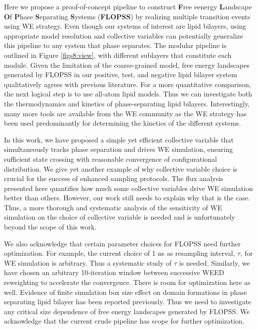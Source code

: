 \documentclass{biophys-new}
\begin{document}
Here we propose a proof-of-concept pipeline to construct \textbf{F}ree eenergy \textbf{L}andscape \textbf{O}f \textbf{P}hase \textbf{S}eparating \textbf{S}ystems (\textbf{FLOPSS}) by realizing multiple transition events using WE strategy.
Even though our systems of interest are lipid bilayers, using appropriate model resolution and collective variables can potentially generalize this pipeline to any system that phase separates.
The modular pipeline is outlined in Figure \ref{figs8:view}, with different sublayers that constitute each module.
Given the limitation of the coarse-grained model, free energy landscapes generated by FLOPSS in our positive, test, and negative lipid bilayer system qualitatively agrees with previous literature.
For a more quantitative comparison, the next logical step is to use all-atom lipid models.
Thus we can investigate both the thermodynamics and kinetics of phase-separating lipid bilayers.
Interestingly, many more tools are available from the WE community as the WE strategy has been used predominantly for determining the kinetics of the different systems.

In this work, we have proposed a simple yet efficient collective variable that simultaneously tracks phase separation and drives WE simulation, ensuring sufficient state crossing with reasonable convergence of configurational distribution. 
We give yet another example of why collective variable choice is crucial for the success of enhanced sampling protocols. 
The flux analysis presented here quantifies how much some collective variables drive WE simulation better than others.
However, our work still needs to explain why that is the case.
Thus, a more thorough and systematic analysis of the sensitivity of WE simulation on the choice of collective variable is needed and is unfortunately beyond the scope of this work.

We also acknowledge that certain parameter choices for FLOPSS need further optimization.
For example, the current choice of 1 ns as resampling interval, $\tau$, for WE simulation is arbitrary.
Thus a systematic study of $\tau$ is needed.
Similarly, we have chosen an arbitrary 10-iteration window between successive WEED reweighting to accelerate the convergence.  
There is room for optimization here as well.
Evidence of finite simulation box size effect on domain formations in phase separating lipid bilayer has been reported previously\cite{Pantelopulos2017}.
Thus we need to investigate any critical size dependence of free energy landscapes generated by FLOPSS.
We acknowledge that the current crude pipeline has scope for further optimization. 
\end{document}
